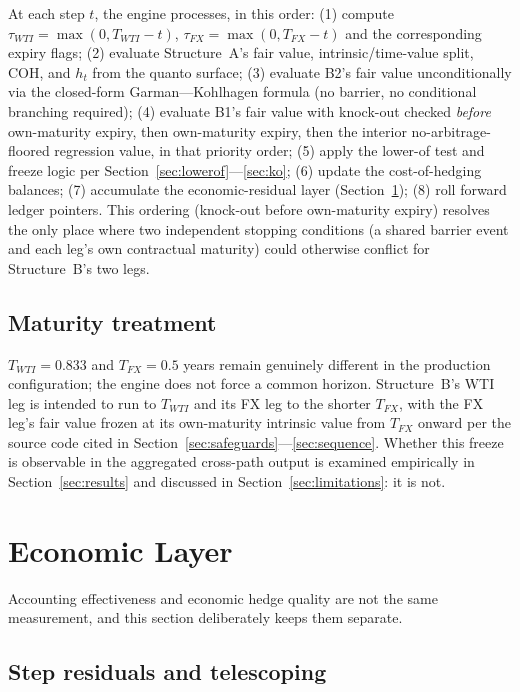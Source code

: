 \documentclass[11pt,a4paper]{article}
\begin{document}
At each step $t$, the engine processes, in this order: (1) compute $\tau_{WTI}=\max(0,T_{WTI}-t)$, $\tau_{FX}=\max(0,T_{FX}-t)$ and the corresponding expiry flags; (2) evaluate Structure~A's fair value, intrinsic/time-value split, COH, and $h_t$ from the quanto surface; (3) evaluate B2's fair value unconditionally via the closed-form Garman---Kohlhagen formula (no barrier, no conditional branching required); (4) evaluate B1's fair value with knock-out checked \emph{before} own-maturity expiry, then own-maturity expiry, then the interior no-arbitrage-floored regression value, in that priority order; (5) apply the lower-of test and freeze logic per Section~\ref{sec:lowerof}---\ref{sec:ko}; (6) update the cost-of-hedging balances; (7) accumulate the economic-residual layer (Section~\ref{sec:econ}); (8) roll forward ledger pointers. This ordering (knock-out before own-maturity expiry) resolves the only place where two independent stopping conditions (a shared barrier event and each leg's own contractual maturity) could otherwise conflict for Structure~B's two legs.

\subsection{Maturity treatment}
\label{sec:maturity}

$T_{WTI}=0.833$ and $T_{FX}=0.5$ years remain genuinely different in the production configuration; the engine does not force a common horizon. Structure~B's WTI leg is intended to run to $T_{WTI}$ and its FX leg to the shorter $T_{FX}$, with the FX leg's fair value frozen at its own-maturity intrinsic value from $T_{FX}$ onward per the source code cited in Section~\ref{sec:safeguards}---\ref{sec:sequence}. Whether this freeze is observable in the aggregated cross-path output is examined empirically in Section~\ref{sec:results} and discussed in Section~\ref{sec:limitations}: it is not.

\section{Economic Layer}
\label{sec:econ}

Accounting effectiveness and economic hedge quality are not the same measurement, and this section deliberately keeps them separate.

\subsection{Step residuals and telescoping}
\label{sec:decon}
\end{document}

